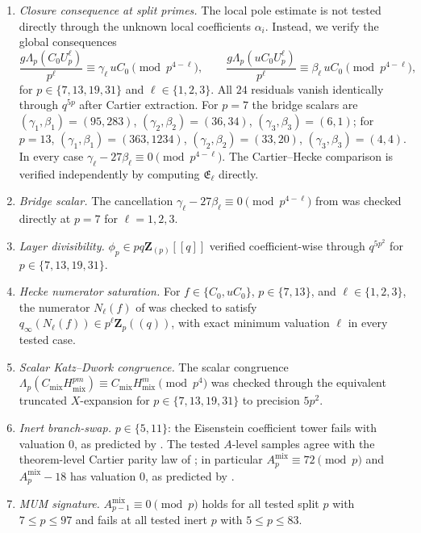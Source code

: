 \documentclass[11pt]{amsart}
\theoremstyle{definition}
\theoremstyle{remark}
\newcommand{\Z}{\mathbf{Z}}
\begin{document}
\begin{enumerate}[label=\textup{(\arabic*)}]
\item \emph{Closure consequence at split primes.} The local pole estimate  is not tested directly through the unknown local coefficients $\alpha_i$. Instead, we verify the global consequences
\[
\frac{g\Lambda_p(C_0 U_p^\ell)}{p^\ell}\equiv\gamma_\ell\,uC_0\pmod{p^{4-\ell}},\qquad
\frac{g\Lambda_p(uC_0 U_p^\ell)}{p^\ell}\equiv\beta_\ell\,uC_0\pmod{p^{4-\ell}},
\]
for $p\in\{7,13,19,31\}$ and $\ell\in\{1,2,3\}$. All $24$ residuals vanish identically through $q^{5p}$ after Cartier extraction. For $p=7$ the bridge scalars are
$(\gamma_1,\beta_1)=(95,283)$, $(\gamma_2,\beta_2)=(36,34)$, $(\gamma_3,\beta_3)=(6,1)$;
for $p=13$,
$(\gamma_1,\beta_1)=(363,1234)$, $(\gamma_2,\beta_2)=(33,20)$, $(\gamma_3,\beta_3)=(4,4)$.
In every case $\gamma_\ell-27\beta_\ell\equiv 0\pmod{p^{4-\ell}}$. The Cartier--Hecke comparison  is verified independently by computing $\mathfrak E_\ell$ directly.

\item \emph{Bridge scalar.} The cancellation $\gamma_\ell-27\beta_\ell\equiv 0\pmod{p^{4-\ell}}$ from  was checked directly at $p=7$ for $\ell=1,2,3$.

\item \emph{Layer divisibility.} $\phi_p\in pq\Z_{(p)}[[q]]$ verified coefficient-wise through $q^{5p^2}$ for $p\in\{7,13,19,31\}$.

\item \emph{Hecke numerator saturation.} For $f\in\{C_0,uC_0\}$, $p\in\{7,13\}$, and $\ell\in\{1,2,3\}$, the numerator $N_\ell(f)$ of  was checked to satisfy $q_\infty(N_\ell(f))\in p^\ell\Z_p((q))$, with exact minimum valuation $\ell$ in every tested case.

\item \emph{Scalar Katz--Dwork congruence.} The scalar congruence $\Lambda_p(C_{\mathrm{mix}}H_{\mathrm{mix}}^{pm})\equiv C_{\mathrm{mix}}H_{\mathrm{mix}}^m\pmod{p^4}$ was checked through the equivalent truncated $X$-expansion for $p\in\{7,13,19,31\}$ to precision $5p^2$.

\item \emph{Inert branch-swap.} $p\in\{5,11\}$: the Eisenstein coefficient tower fails with valuation $0$, as predicted by . The tested $A$-level samples agree with the theorem-level Cartier parity law of ; in particular $A_p^{\mathrm{mix}}\equiv72\pmod p$ and $A_p^{\mathrm{mix}}-18$ has valuation $0$, as predicted by .

\item \emph{MUM signature.} $A_{p-1}^{\mathrm{mix}}\equiv 0\pmod p$ holds for all tested split $p$ with $7\le p\le 97$ and fails at all tested inert $p$ with $5\le p\le 83$.
\end{enumerate}
\end{document}
